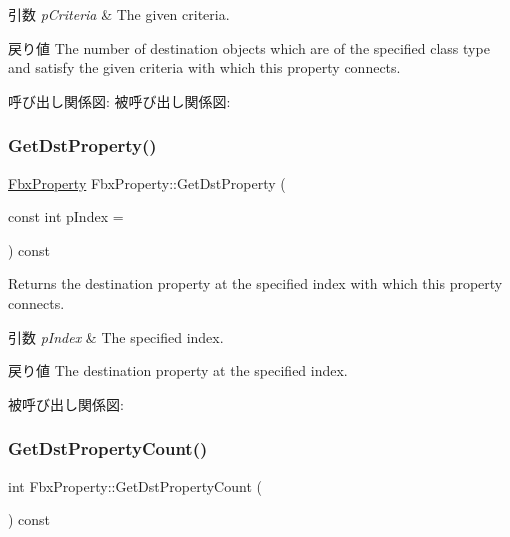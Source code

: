 \begin{DoxyParams}{引数}
{\em p\+Criteria} & The given criteria. \\
\hline
\end{DoxyParams}
\begin{DoxyReturn}{戻り値}
The number of destination objects which are of the specified class type and satisfy the given criteria with which this property connects. 
\end{DoxyReturn}
呼び出し関係図\+:
被呼び出し関係図\+:
\mbox{\label{class_fbx_property_ade7a6b86edce76764b6b4cb4854cb9b7}} 
\subsubsection{\texorpdfstring{Get\+Dst\+Property()}{GetDstProperty()}}
{\footnotesize\ttfamily \hyperlink{class_fbx_property}{Fbx\+Property} Fbx\+Property\+::\+Get\+Dst\+Property (\begin{DoxyParamCaption}\item[{const int}]{p\+Index = {} }\end{DoxyParamCaption}) const}

Returns the destination property at the specified index with which this property connects. 
\begin{DoxyParams}{引数}
{\em p\+Index} & The specified index. \\
\hline
\end{DoxyParams}
\begin{DoxyReturn}{戻り値}
The destination property at the specified index. 
\end{DoxyReturn}
被呼び出し関係図\+:
\mbox{\label{class_fbx_property_abfcc52bdbd9853b10806740934b0230a}} 
\subsubsection{\texorpdfstring{Get\+Dst\+Property\+Count()}{GetDstPropertyCount()}}
{\footnotesize\ttfamily int Fbx\+Property\+::\+Get\+Dst\+Property\+Count (\begin{DoxyParamCaption}{ }\end{DoxyParamCaption}) const}

